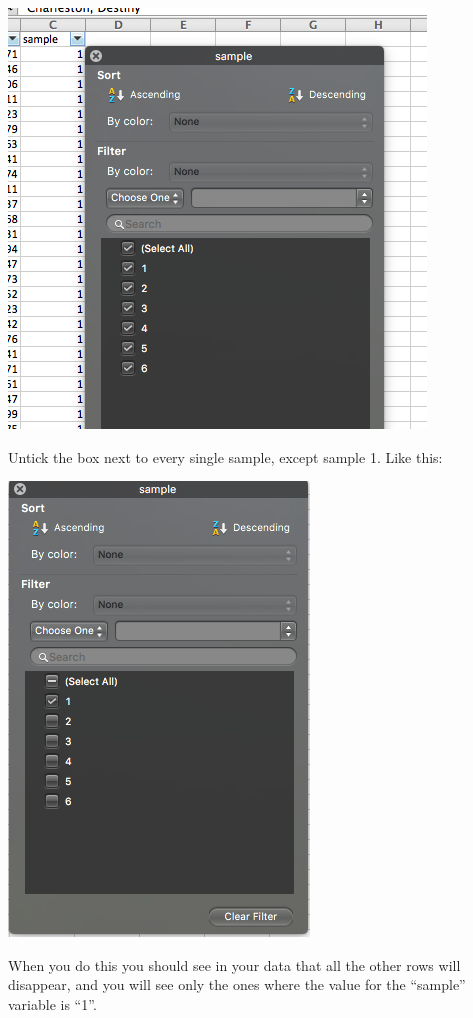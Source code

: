 \documentclass[
]{book}
\begin{document}
\includegraphics{imgs/filter_options.png}

Untick the box next to every single sample, except sample 1. Like this:

\includegraphics{imgs/filter_sample_1.png}

When you do this you should see in your data that all the other rows will disappear, and you will see only the ones where the value for the ``sample'' variable is ``1''.
\end{document}
